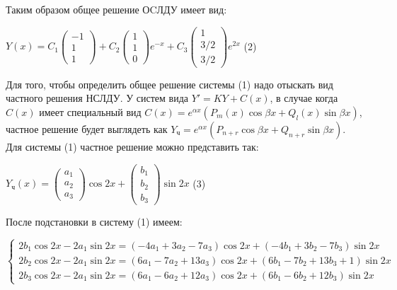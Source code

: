 \documentclass[a4paper, 12pt]{article}
\begin{document}
	
	\quad Таким образом общее решение ОCЛДУ имеет вид:
	
	\begin{center}
		$Y(x) = C_1 \left(
		\begin{array}{c}
			-1 \\
			1 \\
			1
		\end{array}
		\right) + C_2 \left(
		\begin{array}{c}
			1 \\
			1 \\
			0
		\end{array}
		\right) e^{-x} + C_3 \left(
		\begin{array}{c}
			1 \\
			3/2 \\
			3/2
		\end{array}
		\right)e^{2x}$ (2)
	\end{center}
	
	\quad Для того, чтобы определить общее решение системы (1) надо отыскать вид частного решения НСЛДУ. У систем вида $ Y' = KY + C(x) $, в случае когда $C(x)$ имеет специальный вид $ C(x) = e^{\alpha x}(P_m (x) \cos{\beta x} + Q_l (x) \sin {\beta x})$, частное решение будет выглядеть как $Y_{\text{ч}} = e^{\alpha x}(P_{n+r} \cos {\beta x} + Q_{n+r} \sin {\beta x})$. Для системы (1) частное решение можно представить так:
	
	\begin{center}
		$Y_{\text{ч}} (x) = \left(
		\begin{array}{c}
			a_1 \\
			a_2 \\
			a_3
		\end{array}
		\right) \cos{2x} + \left(
		\begin{array}{c}
			b_1 \\
			b_2 \\
			b_3
		\end{array}
		\right) \sin{2x}$ (3)
	\end{center}
	
	\quad После подстановки в систему (1) имеем: 
	\begin{center}
		$\begin{cases}
			2b_1 \cos 2x - 2a_1 \sin 2x = (-4a_1 + 3a_2 - 7a_3)\cos 2x + (-4b_1 + 3b_2 - 7b_3)\sin 2x \\
			2b_2 \cos 2x - 2 a_1 \sin 2x = (6a_1 - 7a_2 + 13a_3) \cos 2x + (6b_1 - 7b_2 + 13b_3 + 1) \sin 2x \\
			2b_3 \cos 2x - 2 a_1 \sin 2x = (6a_1 -6a_2 + 12a_3) \cos 2x + (6b_1 - 6b_2 + 12b_3) \sin 2x
		\end{cases}$
	\end{center}
	
\end{document}
